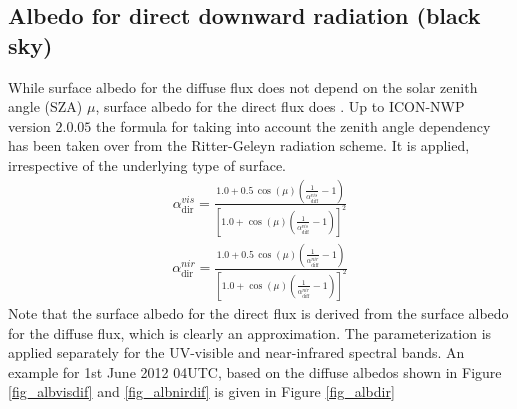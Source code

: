 \documentclass[a4paper,11pt]{article}
\begin{document}
\subsection{Albedo for direct downward radiation (black sky)}
While surface albedo for the diffuse flux does not depend on the solar zenith angle (SZA) $\mu$, surface albedo for the direct flux does \citep{Yang:2008}. 
Up to ICON-NWP version $2.0.05$ the formula for taking into account the zenith angle dependency has been taken over from the Ritter-Geleyn radiation scheme. 
It is applied, irrespective of the underlying type of surface.
\begin{align}
  \alpha_{\mathrm{dir}}^{vis} = \frac{1.0 + 0.5\, \cos(\mu)  \left(\frac{1}{\alpha_{\mathrm{diff}}^{vis}}-1\right)}
                              {\left[1.0 + \cos(\mu)  \left(\frac{1}{\alpha_{\mathrm{diff}}^{vis}}-1\right)\right]^{2}}
\end{align}
\begin{align}
  \alpha_{\mathrm{dir}}^{nir} = \frac{1.0 + 0.5\, \cos(\mu)  \left(\frac{1}{\alpha_{\mathrm{diff}}^{nir}}-1\right)}
                              {\left[1.0 + \cos(\mu)  \left(\frac{1}{\alpha_{\mathrm{diff}}^{nir}}-1\right)\right]^{2}}
\end{align}
Note that the surface albedo for the direct flux is derived from the surface albedo for the diffuse flux, which is clearly an approximation. 
The parameterization is applied separately for the UV-visible and near-infrared spectral bands. An example for 1st June 2012 04UTC, 
based on the diffuse albedos shown in Figure \ref{fig_albvisdif} and \ref{fig_albnirdif} is given in Figure \ref{fig_albdir} 
\end{document}
